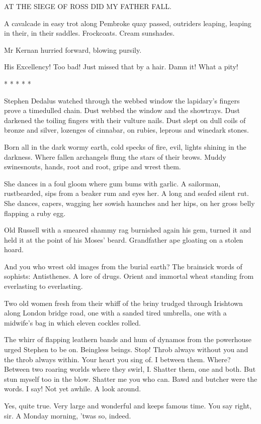     AT THE SIEGE OF ROSS DID MY FATHER FALL.


A cavalcade in easy trot along Pembroke quay passed, outriders leaping,
leaping in their, in their saddles. Frockcoats. Cream sunshades.

Mr Kernan hurried forward, blowing pursily.

His Excellency! Too bad! Just missed that by a hair. Damn it! What a
pity!


    * * * * *


Stephen Dedalus watched through the webbed window the lapidary's fingers
prove a timedulled chain. Dust webbed the window and the showtrays. Dust
darkened the toiling fingers with their vulture nails. Dust slept on dull
coils of bronze and silver, lozenges of cinnabar, on rubies, leprous and
winedark stones.

Born all in the dark wormy earth, cold specks of fire, evil, lights
shining in the darkness. Where fallen archangels flung the stars of their
brows. Muddy swinesnouts, hands, root and root, gripe and wrest them.

She dances in a foul gloom where gum bums with garlic. A sailorman,
rustbearded, sips from a beaker rum and eyes her. A long and seafed
silent rut. She dances, capers, wagging her sowish haunches and her hips,
on her gross belly flapping a ruby egg.

Old Russell with a smeared shammy rag burnished again his gem, turned it
and held it at the point of his Moses' beard. Grandfather ape gloating on
a stolen hoard.

And you who wrest old images from the burial earth? The brainsick words
of sophists: Antisthenes. A lore of drugs. Orient and immortal wheat
standing from everlasting to everlasting.

Two old women fresh from their whiff of the briny trudged through
Irishtown along London bridge road, one with a sanded tired umbrella, one
with a midwife's bag in which eleven cockles rolled.

The whirr of flapping leathern bands and hum of dynamos from the
powerhouse urged Stephen to be on. Beingless beings. Stop! Throb always
without you and the throb always within. Your heart you sing of. I
between them. Where? Between two roaring worlds where they swirl, I.
Shatter them, one and both. But stun myself too in the blow. Shatter me
you who can. Bawd and butcher were the words. I say! Not yet awhile. A
look around.

Yes, quite true. Very large and wonderful and keeps famous time. You say
right, sir. A Monday morning, 'twas so, indeed.

